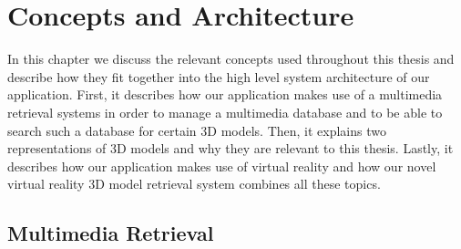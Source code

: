 \chapter{Concepts and Architecture}
\label{chap:concepts_and_architecture}

In this chapter we discuss the relevant concepts used throughout this thesis and describe how they fit together into the high level system architecture of our
application. First, it describes how our application makes use of a multimedia retrieval systems in order to manage a multimedia database and to be able to search such a database for certain 3D models.
Then, it explains two representations of 3D models and why they are relevant to this thesis. Lastly, it describes how our application makes use of virtual reality and how our novel virtual reality 3D model retrieval system combines all these topics.

\section{Multimedia Retrieval}
\label{sec:multimedia_retrieval_concept}

